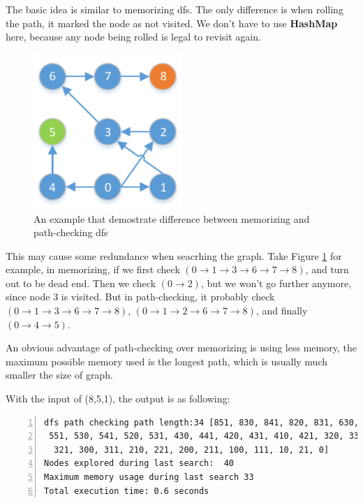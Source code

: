 \documentclass{article}
\begin{document}
The basic idea is similar to memorizing dfs. The only difference is when rolling the path, it marked the node as not visited. We don't have to use \textbf{HashMap} here, because any node being rolled is legal to revisit again.

\begin{figure}[!h]
\centering
\includegraphics[width=0.5\textwidth]{hw1-fig-2.pdf}
\caption{An example that demostrate difference between memorizing and path-checking dfs}
\label{diff}
\end{figure}

This may cause some redundance when seacrhing the graph. Take Figure \ref{diff} for example, in memorizing, if we first check $(0 \rightarrow 1 \rightarrow 3 \rightarrow 6 \rightarrow 7 \rightarrow 8)$, and turn out to be dead end. Then we check $(0 \rightarrow 2)$, but we won't go further anymore, since node $3$ is visited. But in path-checking, it probably check $(0 \rightarrow 1 \rightarrow 3 \rightarrow 6 \rightarrow 7 \rightarrow 8)$, $(0 \rightarrow 1 \rightarrow 2 \rightarrow 6 \rightarrow 7 \rightarrow 8)$, and finally $(0 \rightarrow 4 \rightarrow 5)$.

An obvious advantage of path-checking over memorizing is using less memory, the maximum possible memory used is the longest path, which is usually much smaller the size of graph.

With the input of (8,5,1), the output is as following:

\begin{lstlisting}[numbers=left]
dfs path checking path length:34 [851, 830, 841, 820, 831, 630, 641, 540,
 551, 530, 541, 520, 531, 430, 441, 420, 431, 410, 421, 320, 331, 310,
  321, 300, 311, 210, 221, 200, 211, 100, 111, 10, 21, 0]
Nodes explored during last search:  40
Maximum memory usage during last search 33
Total execution time: 0.6 seconds
\end{lstlisting}
\end{document}
